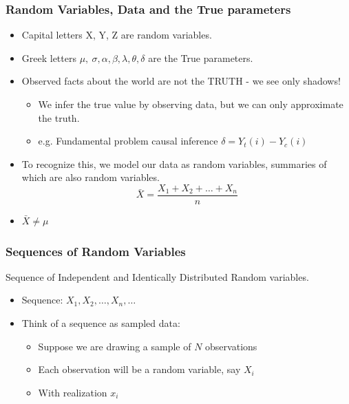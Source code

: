 \documentclass{beamer}
\numberwithin{equation}{section}
\begin{document}
\begin{frame}
\frametitle{Random Variables, Data and the True parameters}
\begin{itemize}
\item Capital letters X, Y, Z are random variables.
\item Greek letters $\mu,\ \sigma, \alpha, \beta, \lambda, \theta, \delta$ are the True parameters.\pause
\item Observed facts about the world are not the TRUTH - we see only shadows!
\begin{itemize}\pause
\item We infer the true value by observing data, but we can only approximate the truth. 
\item e.g. Fundamental problem causal inference $\delta=Y_t(i)-Y_c(i)$
\end{itemize}
\item To recognize this, we model our data as random variables, summaries of which are also random variables.
$$\bar{X}=\frac{X_{1}+ X_{2}+ \hdots+ X_{n}}{n}$$
\item $\bar{X}\neq \mu$
\end{itemize}

\end{frame}


\begin{frame}
\frametitle{Sequences of Random Variables}

Sequence of Independent and Identically Distributed Random variables.
\begin{itemize}
\item[-] Sequence: $X_{1}, X_{2}, \hdots, X_{n}, \hdots $
\item[-] Think of a sequence as sampled \alert{data}:
\begin{itemize}
\item[-] Suppose we are drawing a sample of $N$ observations
\item[-] Each observation will be a random variable, say $X_{i}$
\item[-] With realization $x_{i}$ 
\end{itemize}
\end{itemize}

\end{frame}
\end{document}
